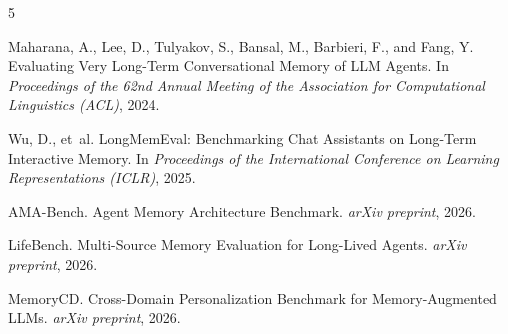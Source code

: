 \documentclass[11pt]{article}
\begin{document}
\begin{thebibliography}{5}

Maharana, A., Lee, D., Tulyakov, S., Bansal, M., Barbieri, F., and Fang, Y.
\newblock Evaluating Very Long-Term Conversational Memory of LLM Agents.
\newblock In \emph{Proceedings of the 62nd Annual Meeting of the Association for Computational Linguistics (ACL)}, 2024.

Wu, D., et~al.
\newblock LongMemEval: Benchmarking Chat Assistants on Long-Term Interactive Memory.
\newblock In \emph{Proceedings of the International Conference on Learning Representations (ICLR)}, 2025.

{AMA-Bench}.
\newblock Agent Memory Architecture Benchmark.
\newblock \emph{arXiv preprint}, 2026.

{LifeBench}.
\newblock Multi-Source Memory Evaluation for Long-Lived Agents.
\newblock \emph{arXiv preprint}, 2026.

{MemoryCD}.
\newblock Cross-Domain Personalization Benchmark for Memory-Augmented LLMs.
\newblock \emph{arXiv preprint}, 2026.

\end{thebibliography}
\end{document}
